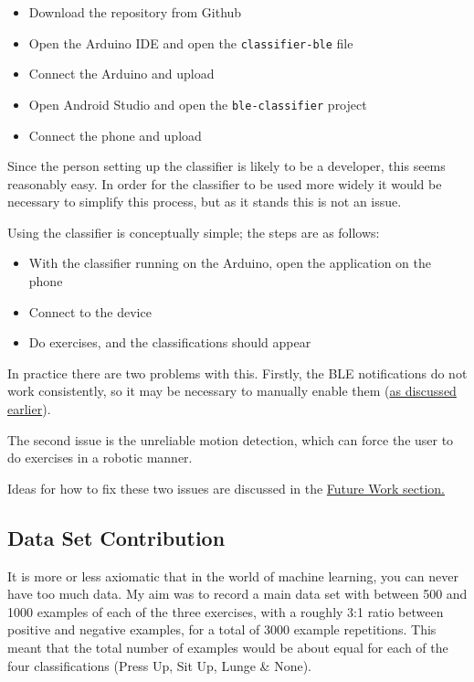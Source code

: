 \documentclass[a4paper]{article}
\begin{document}
\begin{itemize}
\item Download the repository from Github
\item Open the Arduino IDE and open the \lstinline{classifier-ble} file
\item Connect the Arduino and upload
\item Open Android Studio and open the \lstinline{ble-classifier} project
\item Connect the phone and upload
\end{itemize}

Since the person setting up the classifier is likely to be a developer, this seems reasonably easy. In order for the classifier to be used more widely it would be necessary to simplify this process, but as it stands this is not an issue.

Using the classifier is conceptually simple; the steps are as follows:

\begin{itemize}
\item With the classifier running on the Arduino, open the application on the phone
\item Connect to the device
\item Do exercises, and the classifications should appear
\end{itemize}

In practice there are two problems with this. Firstly, the BLE notifications do not work consistently, so it may be necessary to manually enable them (\hyperref[para:ev_cl_classifierble]{as discussed earlier}).

The second issue is the unreliable motion detection, which can force the user to do exercises in a robotic manner. 

Ideas for how to fix these two issues are discussed in the \hyperref[subsec:fw_futurework]{Future Work section.}

\subsection{Data Set Contribution}
\label{subsec:ev_ds}

It is more or less axiomatic that in the world of machine learning, you can never have too much data. My aim was to record a main data set with between 500 and 1000 examples of each of the three exercises, with a roughly 3:1 ratio between positive and negative examples, for a total of 3000 example repetitions. This meant that the total number of examples would be about equal for each of the four classifications (Press Up, Sit Up, Lunge \& None).
\end{document}
